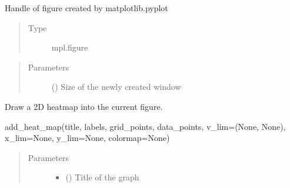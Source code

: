 \documentclass[letterpaper,10pt,english,openany,oneside]{sphinxmanual}
\begin{document}
\begin{fulllineitems}

\begin{fulllineitems}
\label{\detokenize{pygpc:pygpc.Visualization.Visualization.fig}}
Handle of figure created by matplotlib.pyplot
\begin{quote}\begin{description}
\item[{Type}] \leavevmode
mpl.figure

\end{description}\end{quote}

\end{fulllineitems}

\begin{quote}\begin{description}
\item[{Parameters}] \leavevmode
{} (\sphinxstyleliteralemphasis{\sphinxupquote{, }}\sphinxstyleliteralemphasis{\sphinxupquote{, }}\sphinxstyleliteralemphasis{\sphinxupquote{(}}\sphinxstyleliteralemphasis{\sphinxupquote{,}}\sphinxstyleliteralemphasis{\sphinxupquote{)}}) \textendash{} Size of the newly created window

\end{description}\end{quote}

\begin{fulllineitems}
\label{\detokenize{pygpc:pygpc.Visualization.Visualization.add_heat_map}}
Draw a 2D heatmap into the current figure.

add\_heat\_map(title, labels, grid\_points, data\_points, v\_lim=(None, None), x\_lim=None, y\_lim=None, colormap=None)
\begin{quote}\begin{description}
\item[{Parameters}] \leavevmode\begin{itemize}
\item {} 
 () \textendash{} Title of the graph


\end{itemize}
\end{description}
\end{quote}
\end{fulllineitems}
\end{fulllineitems}
\end{document}

